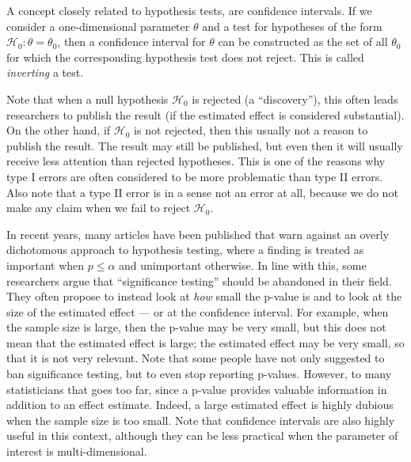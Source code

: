 \documentclass[11pt]{article}
\theoremstyle{plain}
\theoremstyle{definition}
\newcommand{\Hy}{\mathcal{H}}
\begin{document}
A concept closely related to hypothesis tests, are confidence intervals. If we consider a one-dimensional parameter $\theta$ and a test for hypotheses of the form $\Hy_0:\theta=\theta_0$, then a confidence interval for  $\theta$ can be constructed as the set of all $\theta_0$ for which the corresponding hypothesis test does not reject. This is called \emph{inverting} a test.





Note that when a null hypothesis $\Hy_0$ is rejected (a ``discovery''), this often leads researchers to publish the result (if the estimated effect is considered substantial). On the other hand, if $\Hy_0$ is not rejected, then this usually not a reason to publish the result. The result may still be published, but even then it will usually receive less attention than  rejected hypotheses. This is one of the reasons why type I errors are often considered to be more problematic than type II errors.
 Also note that a type II error is in a sense not an error at all, because we do not make any claim when we fail to reject $\Hy_0$. 





In recent years, many articles have been published that warn against an overly dichotomous approach to hypothesis testing, where a finding is treated as important when $p\leq \alpha$ and unimportant otherwise. In line with this, some researchers argue that ``significance testing'' should be abandoned in their field.
They often  propose to instead look at \emph{how} small the p-value is and to look at the size of the estimated effect  --- or at the confidence interval. For example, when the sample size is large, then the p-value may be very small, but this does not mean that the estimated effect is large; the estimated effect may be very small, so that it is not very relevant. Note that some people have not only suggested to ban significance testing, but to even stop reporting p-values. However,  to many statisticians that goes too far, since a p-value provides valuable information in addition to an effect estimate. Indeed, a large estimated effect is highly dubious when the sample size is too small. Note that confidence intervals are also highly useful in this context, although they can be less practical when the parameter of interest is multi-dimensional.
\end{document}
